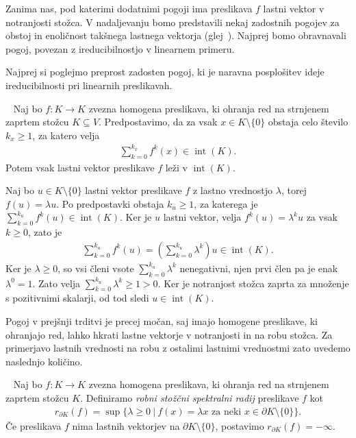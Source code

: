 \documentclass[mat2, tisk]{fmfdelo}
\begin{document}
Zanima nas, pod katerimi dodatnimi pogoji ima preslikava $f$
lastni vektor v notranjosti stožca. V nadaljevanju bomo
predstavili nekaj zadostnih pogojev za obstoj in enoličnost
takšnega lastnega vektorja (glej~\cite[poglavje~6]{LemNuss}).
Najprej bomo obravnavali pogoj, povezan z ireducibilnostjo
v linearnem primeru.

Najprej si poglejmo preprost zadosten pogoj, ki je naravna
posplošitev ideje ireducibilnosti pri linearnih preslikavah.

\begin{trditev}~\label{trd:vsi_lastni_vektorji_v_notranjosti}
  Naj bo $f:K\longrightarrow K$ zvezna homogena preslikava, ki ohranja
  red na strnjenem zaprtem stožcu $K\subseteq V$. Predpostavimo, da za
  vsak $x\in K\setminus\{0\}$ obstaja celo število $k_x\geq1$, za
  katero velja
  \begin{align*}
  \sum_{k=0}^{k_x}f^k(x)\in\operatorname{int}(K).
  \end{align*}
  Potem vsak lastni vektor preslikave $f$ leži v
  $\operatorname{int}(K)$.
\end{trditev}

\begin{dokaz}
  Naj bo $u\in K\setminus\{0\}$ lastni vektor preslikave $f$ z lastno
  vrednostjo $\lambda$, torej $f(u)=\lambda u$. Po predpostavki obstaja
  $k_u\geq1$, za katerega je
  $\sum\limits_{k=0}^{k_u}f^k(u)\in\operatorname{int}(K)$. Ker je $u$ lastni
  vektor, velja $f^k(u)=\lambda^k u$ za vsak $k\geq0$, zato je
  \begin{align*}
  \sum_{k=0}^{k_u}f^k(u)
  =
  \left(\sum_{k=0}^{k_u}\lambda^k\right)u
  \in\operatorname{int}(K).
  \end{align*}
  Ker je $\lambda\geq0$, so vsi členi vsote
  $\sum_{k=0}^{k_u}\lambda^k$ nenegativni, njen prvi člen pa je enak
  $\lambda^0=1$. Zato velja
  $\sum_{k=0}^{k_u}\lambda^k\geq1>0$. Ker je notranjost stožca zaprta za množenje s
  pozitivnimi skalarji, od tod sledi $u\in\operatorname{int}(K)$.
\end{dokaz}

Pogoj v prejšnji trditvi je precej močan, saj imajo homogene
preslikave, ki ohranjajo red, lahko hkrati lastne vektorje v
notranjosti in na robu stožca. Za primerjavo lastnih vrednosti na robu
z ostalimi lastnimi vrednostmi zato uvedemo naslednjo količino.

\begin{definicija}~\label{def:robni_spektralni_radij}
  Naj bo $f:K\longrightarrow K$ zvezna homogena preslikava, ki ohranja
  red na strnjenem zaprtem stožcu $K$. Definiramo
  \emph{robni stožčni spektralni radij} preslikave $f$ kot
  \begin{align*}
  r_{\partial K}(f)
  =
  \sup\{\lambda\geq0 ~|~
  f(x)=\lambda x
  \text{ za neki }
  x\in\partial K\setminus\{0\}\}.
  \end{align*}
  Če preslikava $f$ nima lastnih vektorjev na
  $\partial K\setminus\{0\}$, postavimo $r_{\partial K}(f)=-\infty$.
\end{definicija}
\end{document}

